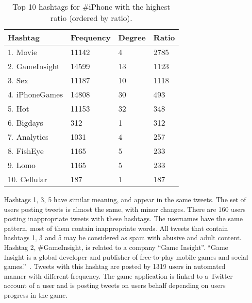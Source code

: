 \documentclass[journal, a4paper, 12pt]{article}
\begin{document}
 \begin{table}[!hbt]
		\begin{center}
		\caption{Top 10 hashtags for \#iPhone with the highest ratio (ordered by ratio).}
		\label{tab:hashtagratioiphonetop}
		\begin{tabular}{|p{5cm}|p{2cm}|p{2cm}|p{2cm}|}
			\hline
			Hashtag & Frequency & Degree & Ratio \\
            \hline
			1. Movie & 11142 & 4 & 2785 \\
			\hline
			2. GameInsight & 14599 & 13 & 1123 \\
			\hline
			3. Sex & 11187 & 10 & 1118 \\
            \hline
            4. iPhoneGames & 14808 & 30 & 493 \\
			\hline
            5. Hot & 11153 & 32 & 348 \\
            \hline
            6. Bigdays & 312 & 1 & 312 \\
			\hline
            7. Analytics & 1031 & 4 & 257 \\
            \hline
            8. FishEye & 1165 & 5 & 233 \\
            \hline
            9. Lomo & 1165 & 5 & 233 \\
            \hline
            10. Cellular & 187 & 1 & 187 \\
            \hline
		\end{tabular}
		\end{center}
	\end{table}
    
    
Hashtags 1, 3, 5 have similar meaning, and appear in the same tweets. The set of users posting tweets is almost the same, with minor changes. There are 160 users posting inappropriate tweets with these hashtags. The usernames have the same pattern, most of them contain inappropriate words. All tweets that contain hashtags 1, 3 and 5 may be considered as spam with abusive and adult content. \\

Hashtag 2, \#GameInsight, is related to a company ``Game Insight''. ``Game Insight is a global developer and publisher of free-to-play mobile games and social games.''~\cite{wiki_gameinsight}. Tweets with this hashtag are posted by 1319 users in automated manner with different frequency. The game application is linked to a Twitter account of a user and is posting tweets on users behalf depending on users progress in the game. \\
\end{document}
